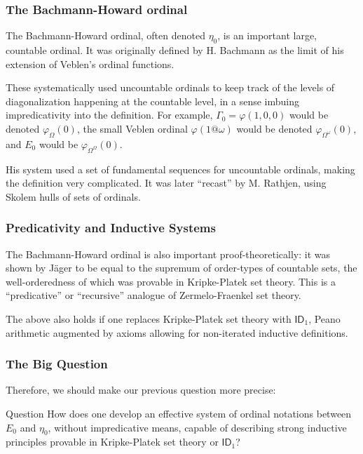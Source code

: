\documentclass{beamer}
\begin{document}
\begin{frame}
\frametitle{The Bachmann-Howard ordinal}
The Bachmann-Howard ordinal, often denoted $\eta_0$, is an important large, countable ordinal. It was originally defined by H. Bachmann as the limit of his extension of Veblen's ordinal functions.

\pause

These systematically used \alert{uncountable} ordinals to keep track of the levels of diagonalization happening at the countable level, in a sense imbuing impredicativity into the definition. For example, $\Gamma_0 = \varphi(1,0,0)$ would be denoted $\varphi_\Omega(0)$, the small Veblen ordinal $\varphi(1@\omega)$ would be denoted $\varphi_{\Omega^\omega}(0)$, and $E_0$ would be $\varphi_{\Omega^\Omega}(0)$.

\pause

His system used a set of fundamental sequences for uncountable ordinals, making the definition very complicated. It was later ``recast'' by M. Rathjen, using Skolem hulls of sets of ordinals.
\end{frame}

\begin{frame}
\frametitle{Predicativity and Inductive Systems}
The Bachmann-Howard ordinal is also important proof-theoretically: it was shown by Jäger to be equal to the supremum of order-types of countable sets, the well-orderedness of which was provable in Kripke-Platek set theory. This is a ``predicative'' or ``recursive'' analogue of Zermelo-Fraenkel set theory.

\pause

The above also holds if one replaces Kripke-Platek set theory with $\mathsf{ID}_1$, Peano arithmetic augmented by axioms allowing for non-iterated inductive definitions.
\end{frame}

\begin{frame}
\frametitle{The Big Question}
Therefore, we should make our previous question more precise:

\begin{block}{Question}
How does one develop an effective system of ordinal notations between $E_0$ and $\eta_0$, without impredicative means, capable of describing strong inductive principles provable in Kripke-Platek set theory or $\mathsf{ID}_1$?
\end{block}
\end{frame}
\end{document}
